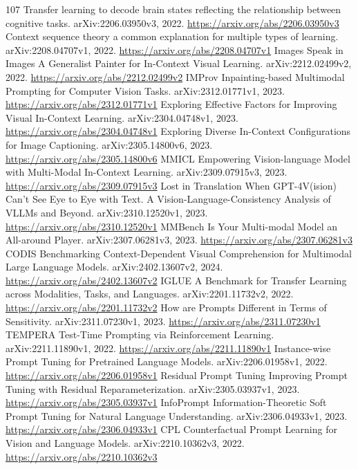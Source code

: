 \documentclass[11pt]{article}
\begin{document}
\begin{thebibliography}{107}
 Transfer learning to decode brain states reflecting the relationship between cognitive tasks. arXiv:2206.03950v3, 2022. \url{https://arxiv.org/abs/2206.03950v3}
 Context sequence theory a common explanation for multiple types of learning. arXiv:2208.04707v1, 2022. \url{https://arxiv.org/abs/2208.04707v1}
 Images Speak in Images A Generalist Painter for In-Context Visual Learning. arXiv:2212.02499v2, 2022. \url{https://arxiv.org/abs/2212.02499v2}
 IMProv Inpainting-based Multimodal Prompting for Computer Vision Tasks. arXiv:2312.01771v1, 2023. \url{https://arxiv.org/abs/2312.01771v1}
 Exploring Effective Factors for Improving Visual In-Context Learning. arXiv:2304.04748v1, 2023. \url{https://arxiv.org/abs/2304.04748v1}
 Exploring Diverse In-Context Configurations for Image Captioning. arXiv:2305.14800v6, 2023. \url{https://arxiv.org/abs/2305.14800v6}
 MMICL Empowering Vision-language Model with Multi-Modal In-Context Learning. arXiv:2309.07915v3, 2023. \url{https://arxiv.org/abs/2309.07915v3}
 Lost in Translation When GPT-4V(ision) Can't See Eye to Eye with Text. A Vision-Language-Consistency Analysis of VLLMs and Beyond. arXiv:2310.12520v1, 2023. \url{https://arxiv.org/abs/2310.12520v1}
 MMBench Is Your Multi-modal Model an All-around Player. arXiv:2307.06281v3, 2023. \url{https://arxiv.org/abs/2307.06281v3}
 CODIS Benchmarking Context-Dependent Visual Comprehension for Multimodal Large Language Models. arXiv:2402.13607v2, 2024. \url{https://arxiv.org/abs/2402.13607v2}
 IGLUE A Benchmark for Transfer Learning across Modalities, Tasks, and Languages. arXiv:2201.11732v2, 2022. \url{https://arxiv.org/abs/2201.11732v2}
 How are Prompts Different in Terms of Sensitivity. arXiv:2311.07230v1, 2023. \url{https://arxiv.org/abs/2311.07230v1}
 TEMPERA Test-Time Prompting via Reinforcement Learning. arXiv:2211.11890v1, 2022. \url{https://arxiv.org/abs/2211.11890v1}
 Instance-wise Prompt Tuning for Pretrained Language Models. arXiv:2206.01958v1, 2022. \url{https://arxiv.org/abs/2206.01958v1}
 Residual Prompt Tuning Improving Prompt Tuning with Residual Reparameterization. arXiv:2305.03937v1, 2023. \url{https://arxiv.org/abs/2305.03937v1}
 InfoPrompt Information-Theoretic Soft Prompt Tuning for Natural Language Understanding. arXiv:2306.04933v1, 2023. \url{https://arxiv.org/abs/2306.04933v1}
 CPL Counterfactual Prompt Learning for Vision and Language Models. arXiv:2210.10362v3, 2022. \url{https://arxiv.org/abs/2210.10362v3}

\end{thebibliography}
\end{document}
